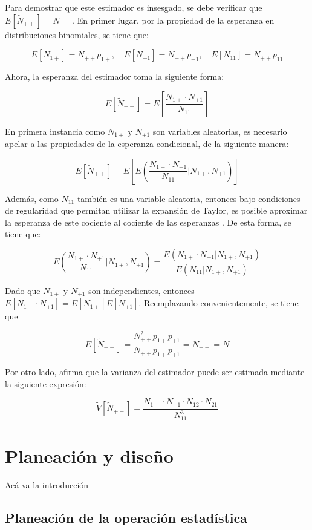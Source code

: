 \documentclass[
  12pt,
]{book}
\begin{document}
Para demostrar que este estimador es insesgado, se debe verificar que \(E[\tilde{N}_{++}] = N_{++}\). En primer lugar, por la propiedad de la esperanza en distribuciones binomiales, se tiene que:

\[
E[N_{1+}] = N_{++} p_{1+}, \quad E[N_{+1}] = N_{++} p_{+1}, \quad E[N_{11}] = N_{++} p_{11}
\]

Ahora, la esperanza del estimador toma la siguiente forma:

\[
E[\tilde{N}_{++}] = E\left[ \frac{N_{1+} \cdot N_{+1}}{N_{11}} \right]
\]

En primera instancia como \(N_{1+}\) y \(N_{+1}\) son variables aleatorias, es necesario apelar a las propiedades de la esperanza condicional, de la siguiente manera:

\[
E[\tilde{N}_{++}] = E \left[ E \left( \frac{N_{1+} \cdot N_{+1}}{N_{11}} \Bigg| N_{1+}, N_{+1} \right) \right]
\]

Además, como \(N_{11}\) también es una variable aleatoria, entonces bajo condiciones de regularidad que permitan utilizar la expansión de Taylor, es posible aproximar la esperanza de este cociente al cociente de las esperanzas \citep{casella2002statistical}. De esta forma, se tiene que:

\[
E \left( \frac{N_{1+} \cdot N_{+1}}{N_{11}} \Bigg| N_{1+}, N_{+1} \right) =  \frac{E (N_{1+} \cdot N_{+1}| N_{1+}, N_{+1} )}{E (N_{11}| N_{1+}, N_{+1} )} 
\]

Dado que \(N_{1+}\) y \(N_{+1}\) son independientes, entonces \(E[N_{1+} \cdot N_{+1}] = E[N_{1+}] E[N_{+1}]\). Reemplazando convenientemente, se tiene que

\[
E[\tilde{N}_{++}] = \frac{N_{++}^2 p_{1+} p_{+1}}{N_{++} p_{1+} p_{+1}} 
= N_{++} = N
\]

Por otro lado, \citet{wolter1986coverage} afirma que la varianza del estimador puede ser estimada mediante la siguiente expresión:

\[
\tilde V[\tilde{N}_{++}] = \frac{N_{1+} \cdot N_{+1} \cdot N_{12} \cdot N_{21}  }{N_{11}^3}
\]

\chapter{Planeación y diseño}\label{cap3}

Acá va la introducción

\section{Planeación de la operación estadística}\label{planeaciuxf3n-de-la-operaciuxf3n-estaduxedstica}
\end{document}
